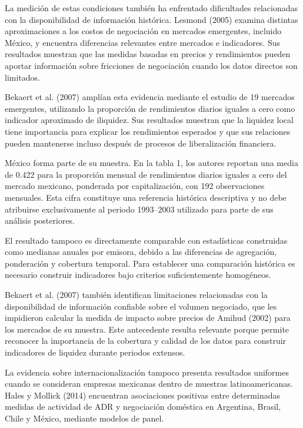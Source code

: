 La medición de estas condiciones también ha enfrentado dificultades relacionadas con la disponibilidad de información histórica. Lesmond (2005) examina distintas aproximaciones a los costos de negociación en mercados emergentes, incluido México, y encuentra diferencias relevantes entre mercados e indicadores. Sus resultados muestran que las medidas basadas en precios y rendimientos pueden aportar información sobre fricciones de negociación cuando los datos directos son limitados.

Bekaert et al. (2007) amplían esta evidencia mediante el estudio de 19 mercados emergentes, utilizando la proporción de rendimientos diarios iguales a cero como indicador aproximado de iliquidez. Sus resultados muestran que la liquidez local tiene importancia para explicar los rendimientos esperados y que sus relaciones pueden mantenerse incluso después de procesos de liberalización financiera.

México forma parte de su muestra. En la tabla 1, los autores reportan una media de 0.422 para la proporción mensual de rendimientos diarios iguales a cero del mercado mexicano, ponderada por capitalización, con 192 observaciones mensuales. Esta cifra constituye una referencia histórica descriptiva y no debe atribuirse exclusivamente al periodo 1993--2003 utilizado para parte de sus análisis posteriores.

El resultado tampoco es directamente comparable con estadísticas construidas como medianas anuales por emisora, debido a las diferencias de agregación, ponderación y cobertura temporal. Para establecer una comparación histórica es necesario construir indicadores bajo criterios suficientemente homogéneos.

Bekaert et al. (2007) también identifican limitaciones relacionadas con la disponibilidad de información confiable sobre el volumen negociado, que les impidieron calcular la medida de impacto sobre precios de Amihud (2002) para los mercados de su muestra. Este antecedente resulta relevante porque permite reconocer la importancia de la cobertura y calidad de los datos para construir indicadores de liquidez durante periodos extensos.

La evidencia sobre internacionalización tampoco presenta resultados uniformes cuando se consideran empresas mexicanas dentro de muestras latinoamericanas. Hales y Mollick (2014) encuentran asociaciones positivas entre determinadas medidas de actividad de ADR y negociación doméstica en Argentina, Brasil, Chile y México, mediante modelos de panel.

